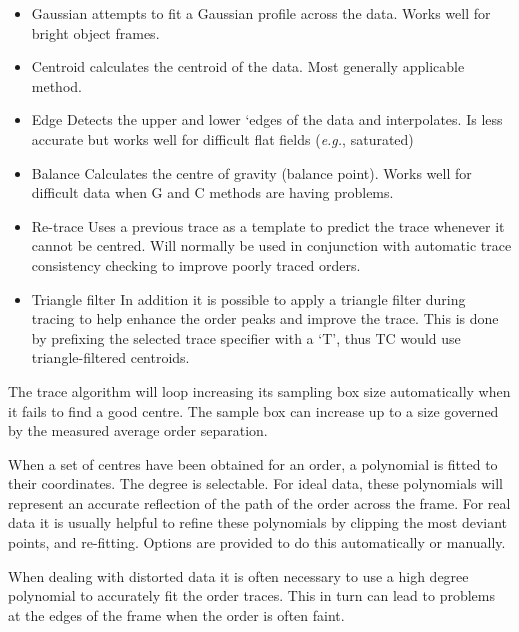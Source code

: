 \documentclass[11pt,twoside]{article}
\newcommand{\myindex}[1]{\index{#1}}
\renewcommand{\myindex}[1]{}
\begin{document}
\begin{itemize}

\item{Gaussian} attempts to fit a Gaussian profile across the data.
Works well for bright object frames.

\item{Centroid} calculates the centroid of the data. Most generally
applicable method.

\item{Edge} Detects the upper and lower `edges of the data and
interpolates. Is less accurate but works well for difficult flat fields
({\it{e.g.}}, saturated)

\item{Balance} Calculates the centre of gravity (balance point). Works
well for difficult data when G and C methods are having problems.

\item{Re-trace} Uses a previous trace as a template to predict the trace
whenever it cannot be centred. Will normally be used in conjunction with
automatic trace consistency checking to improve poorly traced orders.

\item{Triangle filter} In addition it is possible to apply a
triangle filter during tracing to help enhance the order peaks and
improve the trace. This is done by prefixing the selected trace
specifier with a `T', thus TC would use triangle-filtered
centroids.

\myindex{Manually set order path}
\end{itemize}

The trace algorithm will loop increasing its sampling box size
automatically when it fails to find a good centre. The sample box can
increase up to a size governed by the measured average order separation.

When a set of centres have been obtained for an order, a polynomial is
fitted to their coordinates. The degree is selectable.
For ideal data, these polynomials will represent an accurate reflection
of the path of the order across the frame. For real data it is usually
helpful to refine these polynomials by clipping the most deviant points,
and re-fitting.  Options are provided to do this automatically or
manually.

When dealing with distorted data it is often necessary to use a high
degree polynomial to accurately fit the order traces. This in turn can
lead to problems at the edges of the frame when the order is often
faint.
\end{document}
